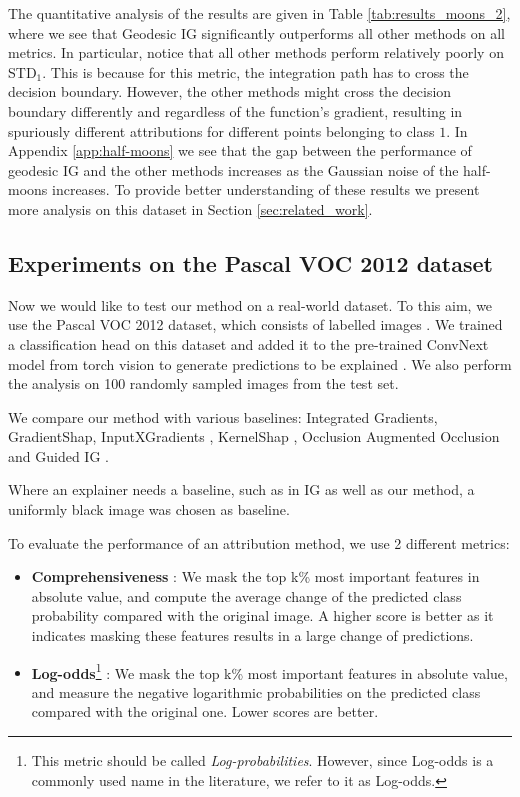 The quantitative analysis of the results are given in Table \ref{tab:results_moons_2}, where we see that Geodesic IG significantly outperforms all other methods on all metrics. In particular, notice that all other methods perform relatively poorly on STD$_1$. This is because for this metric, the integration path has to cross the decision boundary. However, the other methods might cross the decision boundary differently and regardless of the function's gradient, resulting in spuriously different attributions for different points belonging to class $1$. In Appendix \ref{app:half-moons} we see that the gap between the performance of geodesic IG and the other methods increases as the Gaussian noise of the half-moons increases. To provide better understanding of these results we present more analysis on this dataset in Section \ref{sec:related_work}.

\subsection{Experiments on the Pascal VOC 2012 dataset}
\label{subsec:voc}

Now we would like to test our method on a real-world dataset. To this aim, we use the Pascal VOC 2012 dataset, which consists of labelled images \citep{pascal-voc-2012}. We trained a classification head on this dataset and added it to the pre-trained ConvNext model from torch vision to generate predictions to be explained \citep{he2016deep}. We also perform the analysis on 100 randomly sampled images from the test set.

We compare our method with various baselines: Integrated Gradients, GradientShap, InputXGradients \citep{shrikumar2016not}, KernelShap \citep{lundberg2017unified}, Occlusion \citep{zeiler2014visualizing} Augmented Occlusion \citep{tonekaboni2020went} and Guided IG \citep{kapishnikov2021guided}. 

Where an explainer needs a baseline, such as in IG as well as our method, a uniformly black image was chosen as baseline.

To evaluate the performance of an attribution method, we use 2 different metrics:

\begin{itemize}
    \item \textbf{Comprehensiveness} \citep{deyoung2019eraser}: We mask the top k\% most important features in absolute value, and compute the average change of the predicted class probability compared with the original image. A higher score is better as it indicates masking these features results in a large change of predictions.

    \item \textbf{Log-odds}\footnote{This metric should be called \emph{Log-probabilities}. However, since Log-odds is a commonly used name in the literature, we refer to it as Log-odds.} \citep{shrikumar2017learning}: We mask the top k\% most important features in absolute value, and measure the negative logarithmic probabilities on the predicted class compared with the original one. Lower scores are better.
\end{itemize}

